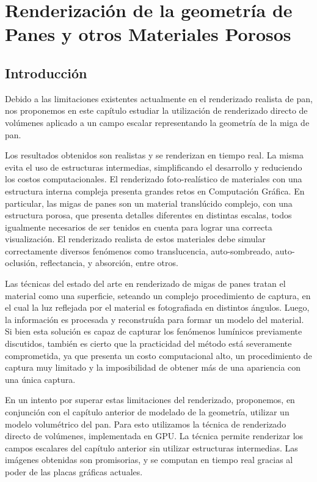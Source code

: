 
\chapter[Renderización de la geometría de Panes]{Renderización de la geometría de Panes y otros Materiales Porosos}
\section{Introducción}
Debido a las limitaciones existentes actualmente en el renderizado realista de pan, nos proponemos en este capítulo estudiar la utilización de renderizado directo de volúmenes aplicado a un campo escalar representando la geometría de la miga de pan. 

Los resultados obtenidos son realistas y se renderizan en tiempo real. La misma evita el uso de estructuras intermedias, simplificando el desarrollo y reduciendo los costos computacionales.
El renderizado foto-realístico de materiales con una estructura interna compleja presenta grandes retos en Computación Gráfica.
En particular, las migas de panes son un material translúcido complejo, con una estructura porosa, que presenta detalles diferentes en distintas escalas, todos igualmente necesarios de ser tenidos en cuenta para lograr una correcta visualización.
El renderizado realista de estos materiales debe simular correctamente diversos fenómenos como translucencia, auto-sombreado, auto-oclusión, reflectancia, y absorción, entre otros.

Las técnicas del estado del arte en renderizado de migas de panes tratan el material como una superficie, seteando un complejo procedimiento de captura, en el cual la luz reflejada por el material es fotografiada en distintos ángulos.
Luego, la información es procesada y reconstruída para formar un modelo del material.
Si bien esta solución es capaz de capturar los fenómenos lumínicos previamente discutidos, también es cierto que la practicidad del método está severamente comprometida, ya que presenta un costo computacional alto, un procedimiento de captura muy limitado y la imposibilidad de obtener más de una apariencia con una única captura.

En un intento por superar estas limitaciones del renderizado, proponemos, en conjunción con el capítulo anterior de modelado de la geometría, utilizar un modelo volumétrico del pan.
Para esto utilizamos la técnica de renderizado directo de volúmenes, implementada en GPU.
La técnica permite renderizar los campos escalares del capítulo anterior sin utilizar estructuras intermedias.
Las imágenes obtenidas son promisorias, y se computan en tiempo real gracias al poder de las placas gráficas actuales.

